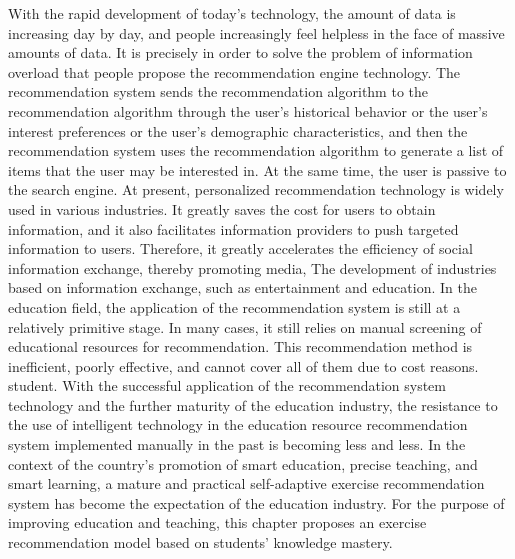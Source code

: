 With the rapid development of today's technology, the amount of data is increasing day by day, and people increasingly feel helpless in the face of massive amounts of data. It is precisely in order to solve the problem of information overload that people propose the recommendation engine technology. The recommendation system sends the recommendation algorithm to the recommendation algorithm through the user's historical behavior or the user's interest preferences or the user's demographic characteristics, and then the recommendation system uses the recommendation algorithm to generate a list of items that the user may be interested in. At the same time, the user is passive to the search engine. At present, personalized recommendation technology is widely used in various industries. It greatly saves the cost for users to obtain information, and it also facilitates information providers to push targeted information to users. Therefore, it greatly accelerates the efficiency of social information exchange, thereby promoting media, The development of industries based on information exchange, such as entertainment and education. In the education field, the application of the recommendation system is still at a relatively primitive stage. In many cases, it still relies on manual screening of educational resources for recommendation. This recommendation method is inefficient, poorly effective, and cannot cover all of them due to cost reasons. student. With the successful application of the recommendation system technology and the further maturity of the education industry, the resistance to the use of intelligent technology in the education resource recommendation system implemented manually in the past is becoming less and less. In the context of the country's promotion of smart education, precise teaching, and smart learning, a mature and practical self-adaptive exercise recommendation system has become the expectation of the education industry. For the purpose of improving education and teaching, this chapter proposes an exercise recommendation model based on students' knowledge mastery.


